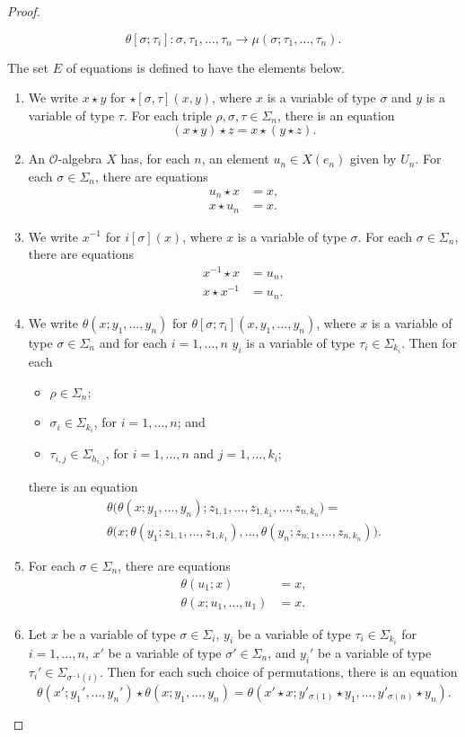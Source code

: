 \begin{proof}
\begin{enumerate}
\[
\theta[\sigma; \tau_i] \colon \sigma, \tau_1, \ldots, \tau_n \to \mu(\sigma; \tau_1, \ldots, \tau_n).
\]
\end{enumerate}
The set $E$ of equations is defined to have the elements below.
\begin{enumerate}
\item We write $x \star y$ for $\star[\sigma, \tau](x,y)$, where $x$ is a variable of type $\sigma$ and $y$ is a variable of type $\tau$. For each triple $\rho, \sigma, \tau \in \Sigma_n$, there is an equation
\[
(x \star y) \star z = x \star (y \star z).
\]
\item An $\mathcal{O}$-algebra $X$ has, for each $n$, an element $u_n \in X(e_n)$ given by $U_n$. For each $\sigma \in \Sigma_n$, there are equations
\begin{align*}
u_n \star x & = x,\\
x \star u_n & = x.
\end{align*}
\item We write $x^{-1}$ for $i[\sigma](x)$, where $x$ is a variable of type $\sigma$. For each $\sigma \in \Sigma_n$, there are equations
\begin{align*}
x^{-1} \star x & = u_n,\\
x \star x^{-1} & = u_n.
\end{align*}
\item We write $\theta(x; y_1, \ldots, y_n)$ for $\theta[\sigma; \tau_i](x, y_1, \ldots, y_n)$, where $x$ is a variable of type $\sigma \in \Sigma_n$ and for each $i= 1, \ldots, n$ $y_i$ is a variable of type $\tau_i \in \Sigma_{k_i}$. Then for each 
\begin{itemize}
\item $\rho \in \Sigma_n$;
\item $\sigma_i \in \Sigma_{k_i}$, for $i= 1, \ldots, n$; and
\item $\tau_{i,j} \in \Sigma_{h_{i,j}}$, for $i=1, \ldots, n$ and $j=1, \ldots, k_i$;
\end{itemize}
there is an equation
\begin{multline*}
\theta\big( \theta(x; y_1, \ldots, y_n); z_{1,1}, \ldots, z_{1, k_1}, \ldots, z_{n, k_n} \big) = \\ \theta\big( x; \theta(y_1; z_{1,1}, \ldots, z_{1, k_1}), \ldots, \theta(y_n; z_{n, 1}, \ldots, z_{n, k_n}) \big).
\end{multline*}
\item For each $\sigma \in \Sigma_n$, there are equations
\begin{align*}
\theta(u_1; x)& = x, \\
\theta(x; u_1, \ldots, u_1) & = x.
\end{align*}
\item Let $x$ be a variable of type $\sigma \in \Sigma_i$, $y_i$ be a variable of type $\tau_i \in \Sigma_{k_i}$ for $i=1, \ldots, n$, $x'$ be a variable of type $\sigma' \in \Sigma_n$, and $y_i'$ be a variable of type $\tau_i' \in \Sigma_{\sigma^{-1}(i)}$. Then for each such choice of permutations, there is an equation
\[
\theta(x'; y_1', \ldots, y_n') \star \theta(x; y_1, \ldots, y_n) = \theta(x' \star x; y'_{\sigma(1)} \star y_1, \ldots, y'_{\sigma(n)} \star y_n).
\]
\end{enumerate}


\end{proof}
